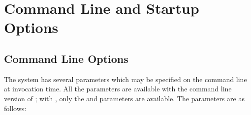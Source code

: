 %
%
%
%
%
\chapter{Command Line and Startup Options}
\label{cmdlineopts}
\section{Command Line Options}

The {\eclipse} system has several parameters which may be specified on the
command line at invocation time. All the parameters are available with
the command line version of ; with , only the 
and 
parameters are available.
The parameters are as follows:

